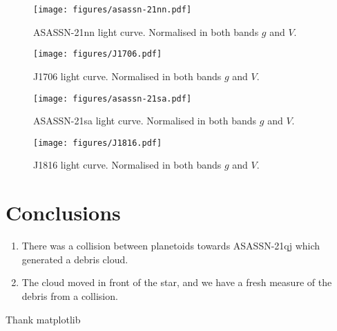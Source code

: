 \documentclass{aa}
\begin{document}
\begin{figure*}
   \begin{centering}
   \texttt{[image: figures/asassn-21nn.pdf]}
      \caption{ASASSN-21nn light curve. Normalised in both bands $g$ and $V$.
              }
              \label{fig:asassn21nn}
              \end{centering}
       \end{figure*}

\begin{figure*}
   \begin{centering}
   \texttt{[image: figures/J1706.pdf]}
      \caption{J1706 light curve. Normalised in both bands $g$ and $V$.
              }
              \label{fig:J1706}
              \end{centering}
       \end{figure*}

\begin{figure*}
   \begin{centering}
   \texttt{[image: figures/asassn-21sa.pdf]}
      \caption{ASASSN-21sa light curve. Normalised in both bands $g$ and $V$.
              }
              \label{fig:asassn21sa}
              \end{centering}
       \end{figure*}




\begin{figure*}
   \begin{centering}
   \texttt{[image: figures/J1816.pdf]}
      \caption{J1816 light curve. Normalised in both bands $g$ and $V$.
              }
              \label{fig:J1816}
              \end{centering}
       \end{figure*}
\section{Conclusions}\label{sec:conclusion}

   \begin{enumerate}
      \item There was a collision between planetoids towards ASASSN-21qj which generated a debris cloud.
      \item The cloud moved in front of the star, and we have a fresh measure of the debris from a collision.
   \end{enumerate}

\begin{acknowledgements}
Thank matplotlib

\end{acknowledgements}



\end{document}
